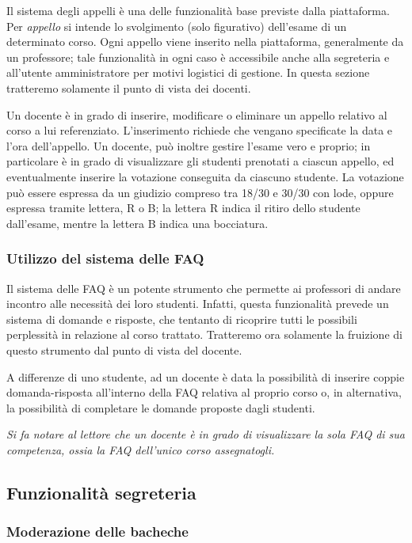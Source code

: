 \documentclass [a4paper,11pt]{book}
\begin{document}
Il sistema degli appelli è una delle funzionalità base previste dalla piattaforma. Per \emph{appello} si intende lo svolgimento (solo figurativo) dell'esame di un determinato corso. Ogni appello viene inserito nella piattaforma, generalmente da un professore; tale funzionalità in ogni caso è accessibile anche alla segreteria e all'utente amministratore per motivi logistici di gestione. In questa sezione tratteremo solamente il punto di vista dei docenti.

Un docente è in grado di inserire, modificare o eliminare un appello relativo al corso a lui referenziato. L'inserimento richiede che vengano specificate la data e l'ora dell'appello. 
Un docente, può inoltre gestire l'esame vero e proprio; in particolare è in grado di visualizzare gli studenti prenotati a ciascun appello, ed eventualmente inserire la votazione conseguita da ciascuno studente. La votazione può essere espressa da un giudizio compreso tra 18/30 e 30/30 con lode, oppure espressa tramite lettera, R o B; la lettera R indica il ritiro dello studente dall'esame, mentre la lettera B indica una bocciatura.

\medskip

\subsubsection{Utilizzo del sistema delle FAQ}

Il sistema delle FAQ è un potente strumento che permette ai professori di andare incontro alle necessità dei loro studenti. Infatti, questa funzionalità prevede un sistema di domande e risposte, che tentanto di ricoprire tutti le possibili perplessità in relazione al corso trattato. Tratteremo ora solamente la fruizione di questo strumento dal punto di vista del docente.

A differenze di uno studente, ad un docente è data la possibilità di inserire coppie domanda-risposta all'interno della FAQ relativa al proprio corso o, in alternativa, la possibilità di completare le domande proposte dagli studenti.

\emph{Si fa notare al lettore che un docente è in grado di visualizzare la sola FAQ di sua competenza, ossia la FAQ dell'unico corso assegnatogli.}
\medskip

\subsection{Funzionalità segreteria}

\subsubsection{Moderazione delle bacheche}
\end{document}
